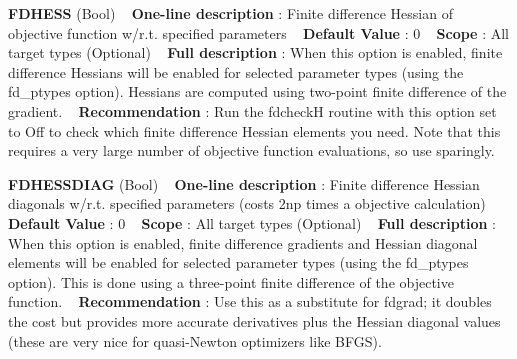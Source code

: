 \begin{DoxyItemize}
\item {\bfseries  F\+D\+H\+E\+SS } (Bool) ~\newline
{\bfseries  One-\/line description }\+: Finite difference Hessian of objective function w/r.\+t. specified parameters ~\newline
{\bfseries  Default Value }\+: 0 ~\newline
{\bfseries  Scope }\+: All target types (Optional) ~\newline
{\bfseries  Full description }\+: When this option is enabled, finite difference Hessians will be enabled for selected parameter types (using the fd\+\_\+ptypes option). Hessians are computed using two-\/point finite difference of the gradient. ~\newline
{\bfseries  Recommendation }\+: Run the \textquotesingle{}fdcheckH\textquotesingle{} routine with this option set to Off to check which finite difference Hessian elements you need. Note that this requires a very large number of objective function evaluations, so use sparingly.\end{DoxyItemize}
\begin{DoxyItemize}
\item {\bfseries  F\+D\+H\+E\+S\+S\+D\+I\+AG } (Bool) ~\newline
{\bfseries  One-\/line description }\+: Finite difference Hessian diagonals w/r.\+t. specified parameters (costs 2np times a objective calculation) ~\newline
{\bfseries  Default Value }\+: 0 ~\newline
{\bfseries  Scope }\+: All target types (Optional) ~\newline
{\bfseries  Full description }\+: When this option is enabled, finite difference gradients and Hessian diagonal elements will be enabled for selected parameter types (using the fd\+\_\+ptypes option). This is done using a three-\/point finite difference of the objective function. ~\newline
{\bfseries  Recommendation }\+: Use this as a substitute for \textquotesingle{}fdgrad\textquotesingle{}; it doubles the cost but provides more accurate derivatives plus the Hessian diagonal values (these are very nice for quasi-\/\+Newton optimizers like B\+F\+GS).\end{DoxyItemize}
